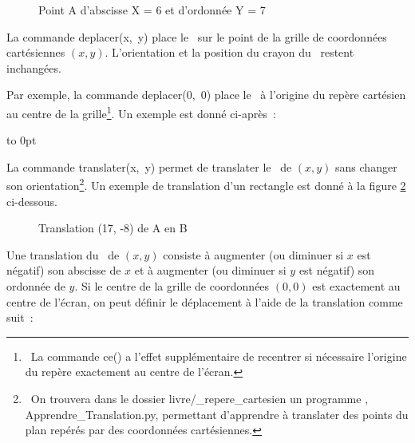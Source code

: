 \begin{figure}[htbp]
 \caption{Point A d'abscisse X = 6 et d'ordonnée Y = 7}
 \label{fig:coorA}
\end{figure}

La commande {\idt deplacer(x,\ y)} place le \robot\ sur le point de la grille de coordonnées cartésiennes $(x, y)$. 
L'orientation et la position du crayon du \robot\ restent inchangées. 

Par exemple, la commande {\idt deplacer(0,\ 0)} place le \robot\ à l'origine du repère
cartésien au centre de la grille\footnote{\ La commande {\idt ce()} a l'effet supplémentaire
de recentrer si nécessaire l'origine du repère exactement au centre de l'écran.}. 
Un exemple est donné ci-après~:

\clearpage
\vspace*{-1cm}
 {\raggedright 
 \vbox to 0pt{\vspace*{\baselineskip}\vspace*{6cm}%
 }%
 \label{prog:LigneDeCarres1}
 
 }

La commande {\idt translater(x,\ y)} permet de translater le \robot\ de $(x, y)$
sans changer son orientation\footnote{\ On trouvera dans le dossier {\idt livre/\_repere\_cartesien}
un programme \python, {\idt Apprendre\_Translation.py}, permettant d'apprendre à translater des points du plan 
repérés par des coordonnées cartésiennes.}. Un exemple de translation d'un rectangle est donné à la figure 
\ref{fig:extrans} ci-dessous.
\begin{figure}[h]
%
 \caption{Translation (17, -8) de A en B}\label{fig:extrans}
\end{figure}
\newpage
Une translation du \robot\ de $(x, y)$ consiste à augmenter (ou diminuer si $x$ est négatif)
son abscisse de $x$ et à augmenter (ou diminuer si $y$ est négatif)
son ordonnée de $y$. Si le centre de la grille de coordonnées $(0, 0)$ est exactement au centre
de l'écran, on peut définir le déplacement à l'aide de la translation comme suit~:

{
\parindent {}
\medskip

\vspace{\neglskip}\mbox{}\par
\vspace{\neglskip}\mbox{\blc \blk{}}\par

\medskip }

